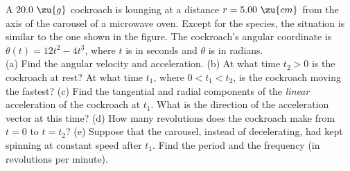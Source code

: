 A $20.0\ \zu{g}$ cockroach is lounging at a distance $r=5.00\ \zu{cm}$
from the axis of the carousel of a microwave oven. Except for the species, the situation is similar
to the one shown in the figure. The cockroach's
angular coordinate is
$\theta(t) = 12t^2 - 4t^3$, where $t$ is in seconds and
$\theta$ is in radians.\\
%
(a) Find the angular velocity and acceleration.\answercheck\hwendpart
%
(b) At what time $t_2 > 0$ is the cockroach at rest? At what time
$t_1$, where $0 < t_1 < t_2$, is the cockroach moving the fastest?\answercheck\hwendpart
%
(c) Find the tangential and radial components of the \emph{linear}
acceleration of the cockroach at $t_1$. What is the direction of
the acceleration vector at this time?\answercheck\hwendpart
%
(d) How many revolutions does the cockroach make from $t=0$ to $t =
t_2$?\answercheck\hwendpart
%
(e) Suppose that the carousel, instead of decelerating, had kept spinning at
constant speed after $t_1$. Find the period and the frequency (in revolutions per minute).\answercheck
